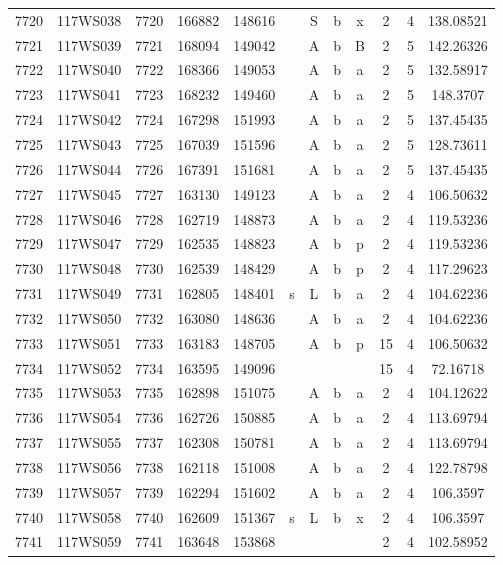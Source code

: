 \begin{tabular}{|*{12}{c|}}
7720 & 117WS038 & 7720 & 166882 & 148616 &  & S & b & x & 2 & 4 & 138.08521 \\ 
7721 & 117WS039 & 7721 & 168094 & 149042 &  & A & b & B & 2 & 5 & 142.26326 \\ 
7722 & 117WS040 & 7722 & 168366 & 149053 &  & A & b & a & 2 & 5 & 132.58917 \\ 
7723 & 117WS041 & 7723 & 168232 & 149460 &  & A & b & a & 2 & 5 & 148.3707 \\ 
7724 & 117WS042 & 7724 & 167298 & 151993 &  & A & b & a & 2 & 5 & 137.45435 \\ 
7725 & 117WS043 & 7725 & 167039 & 151596 &  & A & b & a & 2 & 5 & 128.73611 \\ 
7726 & 117WS044 & 7726 & 167391 & 151681 &  & A & b & a & 2 & 5 & 137.45435 \\ 
7727 & 117WS045 & 7727 & 163130 & 149123 &  & A & b & a & 2 & 4 & 106.50632 \\ 
7728 & 117WS046 & 7728 & 162719 & 148873 &  & A & b & a & 2 & 4 & 119.53236 \\ 
7729 & 117WS047 & 7729 & 162535 & 148823 &  & A & b & p & 2 & 4 & 119.53236 \\ 
7730 & 117WS048 & 7730 & 162539 & 148429 &  & A & b & p & 2 & 4 & 117.29623 \\ 
7731 & 117WS049 & 7731 & 162805 & 148401 & s & L & b & a & 2 & 4 & 104.62236 \\ 
7732 & 117WS050 & 7732 & 163080 & 148636 &  & A & b & a & 2 & 4 & 104.62236 \\ 
7733 & 117WS051 & 7733 & 163183 & 148705 &  & A & b & p & 15 & 4 & 106.50632 \\ 
7734 & 117WS052 & 7734 & 163595 & 149096 &  &  &  &  & 15 & 4 & 72.16718 \\ 
7735 & 117WS053 & 7735 & 162898 & 151075 &  & A & b & a & 2 & 4 & 104.12622 \\ 
7736 & 117WS054 & 7736 & 162726 & 150885 &  & A & b & a & 2 & 4 & 113.69794 \\ 
7737 & 117WS055 & 7737 & 162308 & 150781 &  & A & b & a & 2 & 4 & 113.69794 \\ 
7738 & 117WS056 & 7738 & 162118 & 151008 &  & A & b & a & 2 & 4 & 122.78798 \\ 
7739 & 117WS057 & 7739 & 162294 & 151602 &  & A & b & a & 2 & 4 & 106.3597 \\ 
7740 & 117WS058 & 7740 & 162609 & 151367 & s & L & b & x & 2 & 4 & 106.3597 \\ 
7741 & 117WS059 & 7741 & 163648 & 153868 &  &  &  &  & 2 & 4 & 102.58952 \\ 

\end{tabular}
